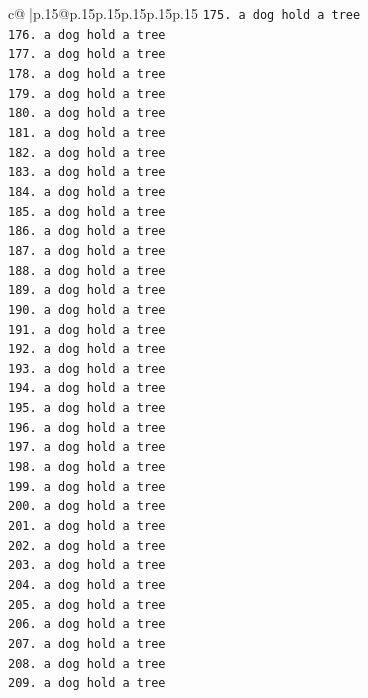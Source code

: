 \documentclass{article}
\begin{document}
{\begin{supertabular}{c@{$\;$}|p{.15\linewidth}@{}p{.15\linewidth}p{.15\linewidth}p{.15\linewidth}p{.15\linewidth}p{.15\linewidth}}
{{{\texttt{175. a dog hold a tree} \\
\texttt{176. a dog hold a tree} \\
\texttt{177. a dog hold a tree} \\
\texttt{178. a dog hold a tree} \\
\texttt{179. a dog hold a tree} \\
\texttt{180. a dog hold a tree} \\
\texttt{181. a dog hold a tree} \\
\texttt{182. a dog hold a tree} \\
\texttt{183. a dog hold a tree} \\
\texttt{184. a dog hold a tree} \\
\texttt{185. a dog hold a tree} \\
\texttt{186. a dog hold a tree} \\
\texttt{187. a dog hold a tree} \\
\texttt{188. a dog hold a tree} \\
\texttt{189. a dog hold a tree} \\
\texttt{190. a dog hold a tree} \\
\texttt{191. a dog hold a tree} \\
\texttt{192. a dog hold a tree} \\
\texttt{193. a dog hold a tree} \\
\texttt{194. a dog hold a tree} \\
\texttt{195. a dog hold a tree} \\
\texttt{196. a dog hold a tree} \\
\texttt{197. a dog hold a tree} \\
\texttt{198. a dog hold a tree} \\
\texttt{199. a dog hold a tree} \\
\texttt{200. a dog hold a tree} \\
\texttt{201. a dog hold a tree} \\
\texttt{202. a dog hold a tree} \\
\texttt{203. a dog hold a tree} \\
\texttt{204. a dog hold a tree} \\
\texttt{205. a dog hold a tree} \\
\texttt{206. a dog hold a tree} \\
\texttt{207. a dog hold a tree} \\
\texttt{208. a dog hold a tree} \\
\texttt{209. a dog hold a tree} \\
}}}
\end{supertabular}}
\end{document}
